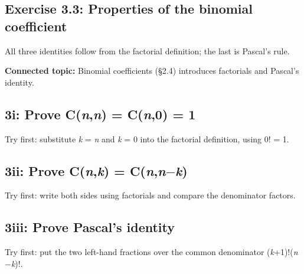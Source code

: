 \documentclass[11pt]{article}
\begin{document}
\begin{keepsection}
\section{Exercise 3.3: Properties of the binomial coefficient}

All three identities follow from the factorial definition; the last is Pascal’s rule.

\textbf{Connected topic:} Binomial coefficients (§2.4) introduces factorials and Pascal’s identity.

\begin{keepsection}
\subsection{3i: Prove C(\textit{n},\textit{n}) = C(\textit{n},0) = 1}

Try first: substitute \textit{k} = \textit{n} and \textit{k} = 0 into the factorial definition, using 0! = 1.

\end{keepsection}

\begin{keepsection}
\subsection{3ii: Prove C(\textit{n},\textit{k}) = C(\textit{n},\textit{n}\ensuremath{-}\textit{k})}

Try first: write both sides using factorials and compare the denominator factors.

\end{keepsection}

\begin{keepsection}
\subsection{3iii: Prove Pascal’s identity}

Try first: put the two left-hand fractions over the common denominator (\textit{k}+1)!(\textit{n}\ensuremath{-}\textit{k})!.

\end{keepsection}
\end{keepsection}
\end{document}

